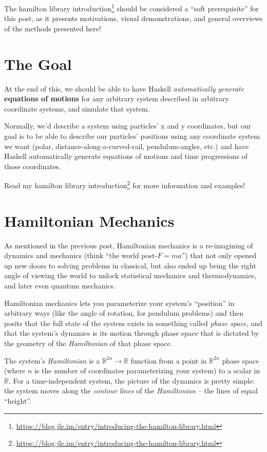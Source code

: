 \documentclass[]{article}
\renewcommand{\href}[2]{#2\footnote{\url{#1}}}
\begin{document}
The
\href{https://blog.jle.im/entry/introducing-the-hamilton-library.html}{hamilton
library introduction} should be considered a ``soft prerequisite'' for this
post, as it presents motivations, visual demonstrations, and general overviews
of the methods presented here!

\hypertarget{the-goal}{%
\section{The Goal}\label{the-goal}}

At the end of this, we should be able to have Haskell \emph{automatically
generate} \textbf{equations of motions} for any arbitrary system described in
arbitrary coordinate systems, and simulate that system.

Normally, we'd describe a system using particles' x and y coordinates, but our
goal is to be able to describe our particles' positions using any coordinate
system we want (polar, distance-along-a-curved-rail, pendulum-angles, etc.) and
have Haskell automatically generate equations of motions and time progressions
of those coordinates.

Read \href{https://blog.jle.im/entry/introducing-the-hamilton-library.html}{my
hamilton library introduction} for more information and examples!

\hypertarget{hamiltonian-mechanics}{%
\section{Hamiltonian Mechanics}\label{hamiltonian-mechanics}}

As mentioned in the previous post, Hamiltonian mechanics is a re-imagining of
dynamics and mechanics (think ``the world post-\(F = m a\)'') that not only
opened up new doors to solving problems in classical, but also ended up being
the right angle of viewing the world to unlock statistical mechanics and
thermodynamics, and later even quantum mechanics.

Hamiltonian mechanics lets you parameterize your system's ``position'' in
arbitrary ways (like the angle of rotation, for pendulum problems) and then
posits that the full state of the system exists in something called \emph{phase
space}, and that the system's dynamics is its motion through phase space that is
dictated by the geometry of the \emph{Hamiltonian} of that phase space.

The system's \emph{Hamiltonian} is a \(\mathbb{R}^{2n} \rightarrow \mathbb{R}\)
function from a point in \(\mathbb{R}^{2n}\) phase space (where \(n\) is the
number of coordinates parameterizing your system) to a scalar in \(\mathbb{R}\).
For a time-independent system, the picture of the dynamics is pretty simple: the
system moves along the \emph{contour lines} of the \emph{Hamiltonian} -- the
lines of equal ``height''.
\end{document}

